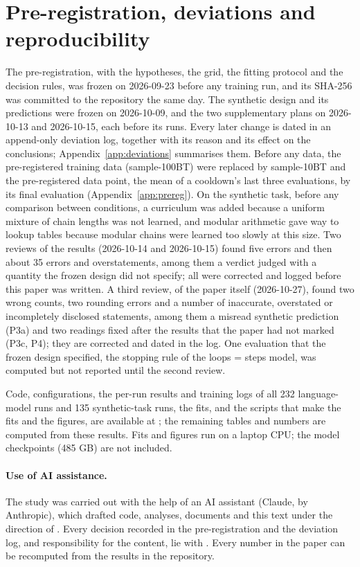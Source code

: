 \section{Pre-registration, deviations and reproducibility}
\label{sec:process}

The pre-registration, with the hypotheses, the grid, the fitting protocol and the decision rules, was frozen on
2026-09-23 before any training run, and its SHA-256 was committed to the repository the same day. The synthetic design
and its predictions were frozen on 2026-10-09, and the two supplementary plans on 2026-10-13 and 2026-10-15, each before
its runs. Every later change is dated in an append-only deviation log, together with its reason and its effect on the
conclusions; Appendix~\ref{app:deviations} summarises them. Before any data, the pre-registered training data
(sample-100BT) were replaced by sample-10BT and the pre-registered data point, the mean of a cooldown's last three
evaluations, by its final evaluation (Appendix~\ref{app:prereg}). On the synthetic task, before any comparison between
conditions, a curriculum was added because a uniform mixture of chain lengths was not learned, and modular arithmetic
gave way to lookup tables because modular chains were learned too slowly at this size. Two reviews of the results (2026-10-14 and 2026-10-15) found five
errors and then about 35 errors and overstatements, among them a verdict judged with a quantity the frozen design did
not specify; all were corrected and logged before this paper was written. A third review, of the paper itself
(2026-10-27), found two wrong counts, two rounding errors and a number of inaccurate, overstated or incompletely
disclosed statements, among them a misread synthetic prediction (P3a) and two readings fixed after the results that the
paper had not marked (P3c, P4); they are corrected and dated in the log. One evaluation that the
frozen design specified, the stopping rule of the loops = steps model, was computed but not reported until the second
review.

Code, configurations, the per-run results and training logs of all 232 language-model runs and 135 synthetic-task runs,
the fits, and the scripts that make the fits and the figures, are available at \coderepo; the remaining tables and numbers
are computed from these results. Fits and figures run on a laptop
CPU; the model checkpoints (485 GB) are not included.

\paragraph{Use of AI assistance.}
The study was carried out with the help of an AI assistant (Claude, by Anthropic), which drafted code, analyses,
documents and this text under the direction of \theauthors. Every decision recorded in the pre-registration and the
deviation log, and responsibility for the content, lie with \theauthors. Every number in the paper can be recomputed from
the results in the repository.
